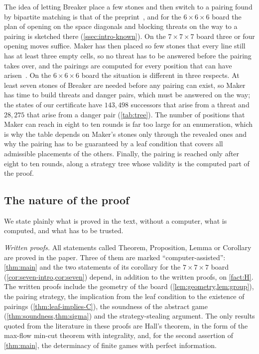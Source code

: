 The idea of letting Breaker place a few stones and then switch to a pairing found by bipartite matching
is that of the preprint~\cite{CainRaymondKallersjo2025}, and for the $6\times6\times6$ board the plan of opening on
the space diagonals and blocking threats on the way to a pairing is sketched
there (\cref{ssec:intro-known}). On the $7\times7\times7$ board three or four opening moves
suffice. Maker has then placed so few stones that every line still has at least three empty cells, so
no threat has to be answered before the pairing takes over, and the pairings are computed for every
position that can have arisen~\cite{CainRaymondKallersjo2025}. On the $6\times6\times6$ board the
situation is different in three respects. At least seven stones of Breaker are needed before any
pairing can exist, so Maker has time to build threats and danger pairs, which must be answered on the
way; the states of our certificate have $143{,}498$ successors that arise from a threat and $28{,}275$
that arise from a danger pair (\cref{tab:tree}). The number of positions that Maker can reach in eight
to ten rounds is far too large for an enumeration, which is why the table depends on Maker's stones only through the
revealed ones and why the pairing has to be guaranteed by a leaf condition that covers all admissible placements
of the others. Finally, the pairing is reached only after eight to ten rounds, along a strategy tree whose
validity is the computed part of the proof.

\subsection{The nature of the proof}\label{ssec:intro-nature}

We state plainly what is proved in the text, without a computer, what is computed, and what has to be
trusted.

\emph{Written proofs.} All statements called Theorem, Proposition, Lemma or Corollary are proved in the
paper. Three of them are marked ``computer-assisted'': \cref{thm:main} and the two statements of its
corollary for the $7\times7\times7$ board (\cref{cor:seven-intro,cor:seven}) depend, in addition to
the written proofs, on \cref{fact:H}. The written proofs include
the geometry of the board (\cref{lem:geometry,lem:group}), the pairing strategy, the implication from
the leaf condition to the existence of pairings (\cref{thm:leaf-implies-C}), the soundness of the
abstract game (\cref{thm:soundness,thm:sigma}) and the strategy-stealing argument. The only results
quoted from the literature in these proofs are Hall's theorem, in the form of the max-flow min-cut
theorem with integrality, and, for the second assertion of \cref{thm:main}, the determinacy of finite
games with perfect information.

